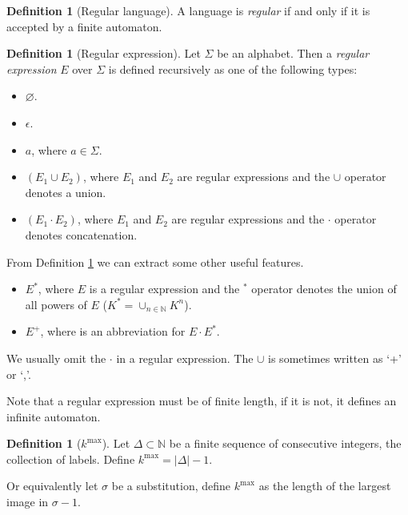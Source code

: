 \documentclass{article}
\theoremstyle{definition}
\newtheorem{definition}[theorem]{Definition}
\begin{document}
\begin{definition}[Regular language] \label{def:regular_language}
A language is \emph{regular} if and only if it is accepted by a finite 
automaton.
\end{definition}

\begin{definition}[Regular expression] \label{def:regular_expression}
Let $\Sigma$ be an alphabet. Then a \emph{regular expression} $E$ over $\Sigma$
is defined recursively as one of the following types:
\begin{itemize}
\item $\varnothing$.
\item $\epsilon$.
\item $a$, where $a \in \Sigma$.
\item $(E_1 \cup E_2)$, where $E_1$ and $E_2$ are regular expressions and the
      $\cup$ operator denotes a union.
\item $(E_1 \cdot E_2)$, where $E_1$ and $E_2$ are regular expressions and the
      $\cdot$ operator denotes concatenation.
\end{itemize}
\end{definition}

From Definition \ref{def:regular_expression} we can extract some other useful
features.
\begin{itemize}
\item $E^*$, where $E$ is a regular expression and the $^*$ operator denotes the
      union of all powers of $E$ ($K^* = \cup_{n \in \mathbb{N}}K^n$).
\item $E^+$, where is an abbreviation for $E \cdot E^*$.
\end{itemize}

We usually omit the $\cdot$ in a regular expression. The $\cup$ is sometimes
written as `+' or `,'.

Note that a regular expression must be of finite length, if it is not, it
defines an infinite automaton.

\begin{definition}[$k^\mathrm{max}$] \label{def:k-max}
Let $\Delta \subset \mathbb{N}$ be a finite sequence of consecutive integers, 
the collection of labels. Define $k^\mathrm{max} = |\Delta| - 1$.

Or equivalently let $\sigma$ be a substitution, define $k^\mathrm{max}$ as
the length of the largest image in $\sigma - 1$.
\end{definition}
\end{document}
